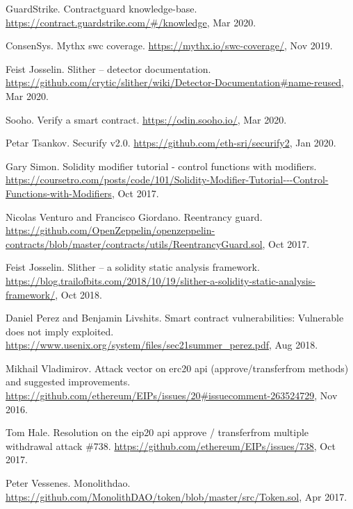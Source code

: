 \begin{thebibliography}{10}
GuardStrike.
\newblock Contractguard knowledge-base.
\newblock \url{https://contract.guardstrike.com/#/knowledge}, Mar 2020.

ConsenSys.
\newblock Mythx swc coverage.
\newblock \url{https://mythx.io/swc-coverage/}, Nov 2019.

Feist Josselin.
\newblock Slither -- detector documentation.
\newblock
  \url{https://github.com/crytic/slither/wiki/Detector-Documentation#name-reused},
  Mar 2020.

Sooho.
\newblock Verify a smart contract.
\newblock \url{https://odin.sooho.io/}, Mar 2020.

Petar Tsankov.
\newblock Securify v2.0.
\newblock \url{https://github.com/eth-sri/securify2}, Jan 2020.

Gary Simon.
\newblock Solidity modifier tutorial - control functions with modifiers.
\newblock
  \url{https://coursetro.com/posts/code/101/Solidity-Modifier-Tutorial---Control-Functions-with-Modifiers},
  Oct 2017.

Nicolas Venturo and Francisco Giordano.
\newblock Reentrancy guard.
\newblock
  \url{https://github.com/OpenZeppelin/openzeppelin-contracts/blob/master/contracts/utils/ReentrancyGuard.sol},
  Oct 2017.

Feist Josselin.
\newblock Slither -- a solidity static analysis framework.
\newblock
  \url{https://blog.trailofbits.com/2018/10/19/slither-a-solidity-static-analysis-framework/},
  Oct 2018.

Daniel Perez and Benjamin Livshits.
\newblock Smart contract vulnerabilities: Vulnerable does not imply exploited.
\newblock \url{https://www.usenix.org/system/files/sec21summer_perez.pdf}, Aug
  2018.

Mikhail Vladimirov.
\newblock Attack vector on erc20 api (approve/transferfrom methods) and
  suggested improvements.
\newblock
  \url{https://github.com/ethereum/EIPs/issues/20\#issuecomment-263524729}, Nov
  2016.

Tom Hale.
\newblock Resolution on the eip20 api approve / transferfrom multiple
  withdrawal attack \#738.
\newblock \url{https://github.com/ethereum/EIPs/issues/738}, Oct 2017.

Peter Vessenes.
\newblock Monolithdao.
\newblock \url{https://github.com/MonolithDAO/token/blob/master/src/Token.sol},
  Apr 2017.


\end{thebibliography}
